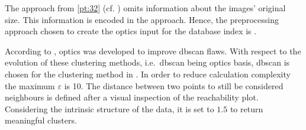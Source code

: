 The approach from \autoref{pt:32} (cf. \cite{OPTICS1999}) omits information about the images' original size. 
This information is encoded in the \eigendocs{} approach.
Hence, the preprocessing approach chosen to create the \ac{optics} input for the \databaseName{} database index is \eigendocs{}. 

According to \citeauthor{OPTICS2014}, \ac{optics} was developed to improve \ac{dbscan} flaws.
With respect to the evolution of these clustering methods, i.e.\ \ac{dbscan} being \ac{optics} basis, 
\ac{dbscan} is chosen for the clustering method in .
In order to reduce calculation complexity the maximum $\varepsilon$ is 10.
The distance between two points to still be considered neighbours is defined after a visual inspection of the reachability plot.
Considering the intrinsic structure of the \eigendocs{} data, it is set to $1.5$ to return meaningful clusters.